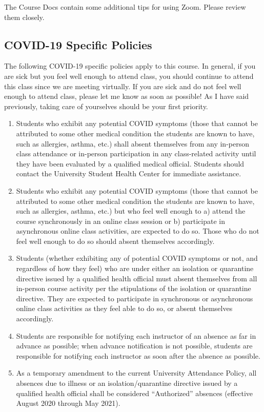 \documentclass[
]{book}
\providecommand{\tightlist}{%
  \setlength{\itemsep}{0pt}\setlength{\parskip}{0pt}}
\begin{document}
The Course Docs contain some additional tips for using Zoom. Please review them closely.

\hypertarget{covid-19-specific-policies}{%
\subsection{COVID-19 Specific Policies}\label{covid-19-specific-policies}}

The following COVID-19 specific policies apply to this course. In general, if you are sick but you feel well enough to attend class, you should continue to attend this class since we are meeting virtually. If you are sick and do not feel well enough to attend class, please let me know as soon as possible! As I have said previously, taking care of yourselves should be your first priority.

\begin{enumerate}
\def\labelenumi{\arabic{enumi}.}
\tightlist
\item
  Students who exhibit any potential COVID symptoms (those that cannot be attributed to some other medical condition the students are known to have, such as allergies, asthma, etc.) shall absent themselves from any in-person class attendance or in-person participation in any class-related activity until they have been evaluated by a qualified medical official. Students should contact the University Student Health Center for immediate assistance.
\item
  Students who exhibit any potential COVID symptoms (those that cannot be attributed to some other medical condition the students are known to have, such as allergies, asthma, etc.) but who feel well enough to a) attend the course synchronously in an online class session or b) participate in asynchronous online class activities, are expected to do so. Those who do not feel well enough to do so should absent themselves accordingly.
\item
  Students (whether exhibiting any of potential COVID symptoms or not, and regardless of how they feel) who are under either an isolation or quarantine directive issued by a qualified health official must absent themselves from all in-person course activity per the stipulations of the isolation or quarantine directive. They are expected to participate in synchronous or asynchronous online class activities as they feel able to do so, or absent themselves accordingly.
\item
  Students are responsible for notifying each instructor of an absence as far in advance as possible; when advance notification is not possible, students are responsible for notifying each instructor as soon after the absence as possible.
\item
  As a temporary amendment to the current University Attendance Policy, all absences due to illness or an isolation/quarantine directive issued by a qualified health official shall be considered ``Authorized'' absences (effective August 2020 through May 2021).
\end{enumerate}
\end{document}
